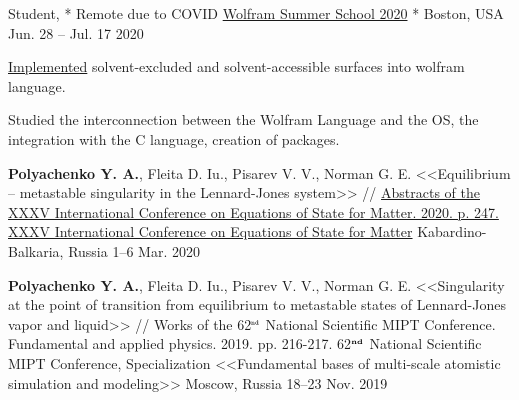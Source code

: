 

\begin{cventries}

  \cventry
    {Student, * Remote due to COVID} %
    {\href{https://education.wolfram.com/summer/school/}{Wolfram Summer School 2020}} %
    {* Boston, USA} %
    {Jun. 28 -- Jul. 17 2020} %
    {
      \begin{cvitems} %
        \item {\href{https://community.wolfram.com/groups/-/m/t/2029621}{Implemented} solvent-excluded and solvent-accessible surfaces into wolfram language.}      
        \item {Studied the interconnection between the Wolfram Language and the OS, the integration with the C language, creation of packages.}
      \end{cvitems}
    }


  \cventry
    {\textbf{Polyachenko Y. A.}, Fleita D. Iu., Pisarev V. V., Norman G. E. <<Equilibrium – metastable singularity in the Lennard-Jones system>> // \href{http://www.ihed.ras.ru/elbrus20/program/restore.php?id=78}{Abstracts of the XXXV International Conference on Equations of State for Matter. 2020. p. 247.}} %
    {\href{http://www.ihed.ras.ru/elbrus20/}{XXXV International Conference on Equations of State for Matter}} %
    {Kabardino-Balkaria, Russia} %
    {1--6 Mar. 2020} %
    {
      \begin{cvitems} %
      \end{cvitems}
    }


  \cventry
    {\textbf{Polyachenko Y. A.}, Fleita D. Iu., Pisarev V. V., Norman G. E. <<Singularity at the point of transition from equilibrium to metastable states of Lennard-Jones vapor and liquid>> // Works of the 62$^{\texttt{\tiny nd}}$ National Scientific MIPT Conference. Fundamental and applied physics. 2019. pp. 216-217.} %
    {62$^{\textbf{\tiny nd}}$ National Scientific MIPT Conference, Specialization <<Fundamental bases of multi-scale atomistic simulation and modeling>>} %
    {Moscow, Russia} %
    {18--23 Nov. 2019} %
    {
      \begin{cvitems} %
      \end{cvitems}
    }


\end{cventries}
